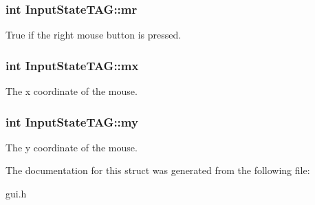 \subsubsection[{mr}]{\setlength{\rightskip}{0pt plus 5cm}int Input\+State\+T\+A\+G\+::mr}\label{struct_input_state_t_a_g_a35ba7fb1aba0fc64ec955edefef3d478}
True if the right mouse button is pressed. \hypertarget{struct_input_state_t_a_g_ab7d3dc6bbe1cf1fa6bd93a4b50300a92}{}
\subsubsection[{mx}]{\setlength{\rightskip}{0pt plus 5cm}int Input\+State\+T\+A\+G\+::mx}\label{struct_input_state_t_a_g_ab7d3dc6bbe1cf1fa6bd93a4b50300a92}
The x coordinate of the mouse. \hypertarget{struct_input_state_t_a_g_a70ae2942b0b4a47cb26f52158ee65739}{}
\subsubsection[{my}]{\setlength{\rightskip}{0pt plus 5cm}int Input\+State\+T\+A\+G\+::my}\label{struct_input_state_t_a_g_a70ae2942b0b4a47cb26f52158ee65739}
The y coordinate of the mouse. 

The documentation for this struct was generated from the following file\+:\begin{DoxyCompactItemize}
\item 
gui.\+h\end{DoxyCompactItemize}
